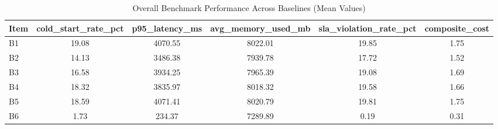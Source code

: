 \begin{table}[htbp]
\centering
\caption{Overall Benchmark Performance Across Baselines (Mean Values)}
\label{tab:overall_perf}
\begin{tabular}{lccccc}
\hline
Item & cold\_start\_rate\_pct & p95\_latency\_ms & avg\_memory\_used\_mb & sla\_violation\_rate\_pct & composite\_cost \\
\hline
B1 & 19.08 & 4070.55 & 8022.01 & 19.85 & 1.75 \\
B2 & 14.13 & 3486.38 & 7939.78 & 17.72 & 1.52 \\
B3 & 16.58 & 3934.25 & 7965.39 & 19.08 & 1.69 \\
B4 & 18.32 & 3835.97 & 8018.32 & 19.58 & 1.66 \\
B5 & 18.59 & 4071.41 & 8020.79 & 19.81 & 1.75 \\
B6 & 1.73 & 234.37 & 7289.89 & 0.19 & 0.31 \\
\hline
\end{tabular}
\end{table}